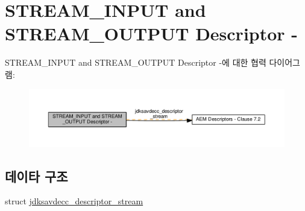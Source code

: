 \hypertarget{group__descriptor__stream}{}\section{S\+T\+R\+E\+A\+M\+\_\+\+I\+N\+P\+UT and S\+T\+R\+E\+A\+M\+\_\+\+O\+U\+T\+P\+UT Descriptor -\/}
\label{group__descriptor__stream}
S\+T\+R\+E\+A\+M\+\_\+\+I\+N\+P\+UT and S\+T\+R\+E\+A\+M\+\_\+\+O\+U\+T\+P\+UT Descriptor -\/에 대한 협력 다이어그램\+:
\nopagebreak
\begin{figure}[H]
\begin{center}
\leavevmode
\includegraphics[width=350pt]{group__descriptor__stream}
\end{center}
\end{figure}
\subsection*{데이타 구조}
\begin{DoxyCompactItemize}
\item 
struct \hyperlink{structjdksavdecc__descriptor__stream}{jdksavdecc\+\_\+descriptor\+\_\+stream}
\end{DoxyCompactItemize}
